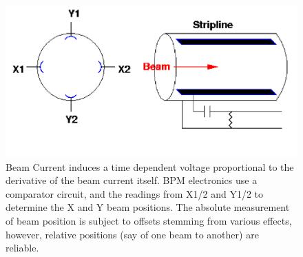 \begin{figure}
\begin{center}
\includegraphics[width=1.0\linewidth]{../DataStreams/figs/bpm_schematic}
\caption{ Beam Current induces a time dependent voltage proportional to the derivative of
the beam current itself. BPM electronics use a comparator circuit, and the readings from
X1/2 and Y1/2 to determine the X and Y beam positions. The absolute measurement of beam
position is subject to offsets stemming from various effects, however, relative positions
(say of one beam to another) are reliable.~\cite{kawallfocus2005}}
\label{fig:bpm_schematic_cartoon}
\end{center}
\end{figure}
